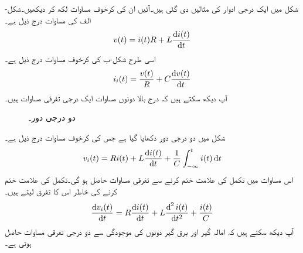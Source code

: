 شکل  میں ایک درجی ادوار کی مثالیں دی گئی ہیں۔آئیں ان کی کرخوف مساوات لکھ کر دیکھیں۔شکل-الف کی مساوات درج ذیل ہے۔
\begin{align}
v(t)=i(t)R+L \frac{\dif i(t)}{\dif t}
\end{align}
اسی طرح شکل-ب کی کرخوف مساوات درج ذیل ہے۔
\begin{align}
i_i(t)=\frac{v(t)}{R}+C\frac{\dif v(t)}{\dif t}
\end{align}
آپ دیکھ سکتے ہیں کہ درج بالا دونوں مساوات ایک درجی تفرقی مساوات ہیں۔

\begin{figure}
\centering
{}
\caption{دو درجی دور۔}
\label{شکل_عارضی_دور_درجی_دور_الف}
\end{figure}

شکل  میں دو درجی دور دکھایا گیا ہے جس کی کرخوف مساوات درج ذیل ہے۔
\begin{align*}
v_i(t)=R i(t)+L\frac{\dif i(t)}{\dif t}+\frac{1}{C} \int_{-\infty}^{t}i(t) \dif t
\end{align*}
اس مساوات میں تکمل کی علامت ختم کرنے سے تفرقی مساوات حاصل ہو گی۔تکمل کی علامت ختم کرنے کی خاطر اس کا تفرق لیتے ہیں۔
\begin{align}
\frac{\dif v_i(t)}{\dif t}=R \frac{\dif i(t)}{\dif t}+L\frac{\dif^{\,2} i(t)}{\dif t^2}+\frac{i(t)}{C}
\end{align} 
آپ دیکھ سکتے ہیں کہ امالہ گیر اور برق گیر دونوں کی موجودگی سے دو درجی تفرقی مساوات حاصل ہوتی ہے۔


